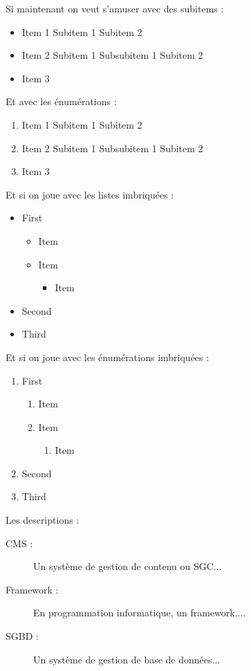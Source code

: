 \documentclass[a4paper,11pt]{report}    %
\begin{document}
Si maintenant on veut s'amuser avec des subitems :
\begin{itemize}
	\item Item 1
	\subitem Subitem 1
	\subitem Subitem 2
	\item Item 2
	\subitem Subitem 1
	\subsubitem Subsubitem 1
	\subitem Subitem 2
	\item Item 3
\end{itemize}

Et avec les énumérations :
\begin{enumerate}
	\item Item 1
	\subitem Subitem 1
	\subitem Subitem 2
	\item Item 2
	\subitem Subitem 1
	\subsubitem Subsubitem 1
	\subitem Subitem 2
	\item Item 3
\end{enumerate}

Et si on joue avec les listes imbriquées :
\begin{itemize}
	\item First
	\begin{itemize}
		\item Item
		\item Item
		\begin{itemize}
			\item Item 
		\end{itemize}
	\end{itemize}
	\item Second 
	\item Third
\end{itemize}

Et si on joue avec les énumérations imbriquées :
\begin{enumerate}
	\item First
	\begin{enumerate}
		\item Item
		\item Item
		\begin{enumerate}
			\item Item 
		\end{enumerate}
	\end{enumerate}
	\item Second 
	\item Third
\end{enumerate}

\newpage

Les descriptions :
\begin{description}
	\item[CMS :] Un système de gestion de contenu ou SGC...
	\item[Framework :] En programmation informatique, un framework....
	\item[SGBD :] Un système de gestion de base de données...
\end{description}
\end{document}
